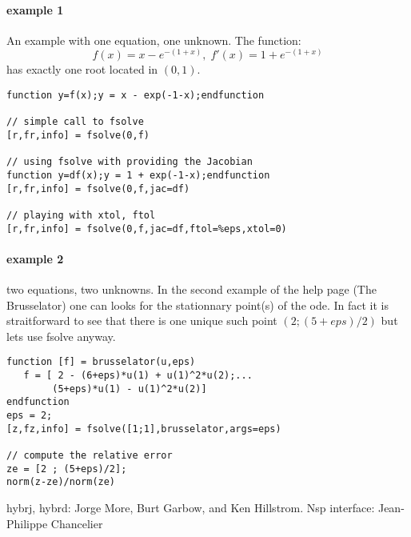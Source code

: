 \begin{examples}
  
\paragraph{example 1} An example with one equation, one unknown. The function:
$$
  f(x) = x - e^{-(1+x)}, \; f'(x) = 1 + e^{-(1+x)}
$$ 
has exactly one root located in $(0,1)$.
\begin{Verbatim}
function y=f(x);y = x - exp(-1-x);endfunction

// simple call to fsolve
[r,fr,info] = fsolve(0,f)

// using fsolve with providing the Jacobian
function y=df(x);y = 1 + exp(-1-x);endfunction
[r,fr,info] = fsolve(0,f,jac=df)

// playing with xtol, ftol
[r,fr,info] = fsolve(0,f,jac=df,ftol=%eps,xtol=0)
\end{Verbatim}
 
\paragraph{example 2} two equations, two unknowns. In the second example
of the  help page (The Brusselator) one can looks for
the stationnary point(s) of the ode. In fact it is straitforward to see
that there is one unique such point $(2;(5+eps)/2)$ but lets use fsolve
anyway.
\begin{Verbatim}
function [f] = brusselator(u,eps)
   f = [ 2 - (6+eps)*u(1) + u(1)^2*u(2);...
        (5+eps)*u(1) - u(1)^2*u(2)]
endfunction
eps = 2;
[z,fz,info] = fsolve([1;1],brusselator,args=eps)

// compute the relative error
ze = [2 ; (5+eps)/2];
norm(z-ze)/norm(ze)
\end{Verbatim}
\end{examples}

\begin{manseealso}
\end{manseealso}

\begin{authors}
 hybrj, hybrd: Jorge More, Burt Garbow, and Ken Hillstrom. Nsp interface: Jean-Philippe Chancelier
\end{authors}
